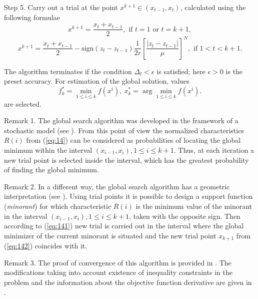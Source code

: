 \documentclass[smallcondensed]{svjour3}     %
\begin{document}
Step 5. Carry out a trial at the point $x^{k+1}\in(x_{t-1},x_t)$, calculated using the following formulae
\[
x^{k+1} = \frac{x_t+x_{t-1}}{2}, \textrm{ if } t=1 \textrm{ or } t=k+1,
\]
\begin{equation}\label{eq:142}
x^{k+1} = \frac{x_t+x_{t-1}}{2} - \mathrm{sign}(z_t-z_{t-1})\frac{1}{2r}\left[\frac{\left|z_t-z_{t-1}\right|}{\mu}\right]^N, \textrm{ if } 1<t<k+1.
\end{equation}

The algorithm terminates if the condition $\Delta_t<\epsilon$ is satisfied; here $\epsilon>0$ is the preset accuracy. For estimation of the global solution, values
\[
f_k^\ast=\min_{1\leq i \leq k}f(x^i), \ x_k^\ast=\arg \min_{1\leq i \leq k}f(x^i).
\]
are selected.

Remark 1. The global search algorithm was developed in the framework of a stochastic model (see \cite{RefStrongin2000}). From this point of view the normalized characteristics $R(i)$ from (\ref{eq:14}) can be considered as probabilities of locating the global minimum within the interval  $(x_{i-1},x_i), 1\leq i \leq k+1$. Thus, at each iteration a new trial point is selected inside the interval, which has the greatest probability of finding the global minimum.

Remark 2. In a different way, the global search algorithm has a geometric interpretation (see \cite{RefSergeyev2001}). Using trial points it is possible to design a support function (\textit{minorant}) for which characteristic $R(i)$ is the minimum value of the minorant in the interval $(x_{i-1},x_i), 1\leq i\leq k+1$, taken with the opposite sign. Then according to (\ref{eq:141}) new trial is carried out in the interval where the global minimizer of the current minorant is situated and the new trial point $x_{k+1}$ from (\ref{eq:142}) coincides with it.


Remark 3. The proof of convergence of this algorithm is provided in \cite{RefStrongin2000}. The modifications taking into account existence of inequality constraints in the problem and the information about the objective function derivative are given in \cite{RefBarkalov,RefGergel1996,RefGergel1997}.
\end{document}
